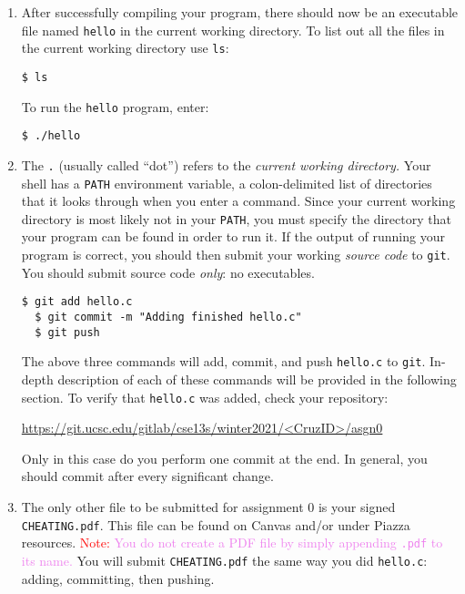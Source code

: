 \documentclass[11pt]{article}
\begin{document}
\begin{enumerate}
  \item After successfully compiling your program, there should now be an
    executable file named \texttt{hello} in the current working directory. To
    list out all the files in the current working directory use \texttt{ls}:

\begin{lstlisting}[style=bashstyle]
  $ ls
\end{lstlisting}

    To run the \texttt{hello} program, enter:

\begin{lstlisting}[style=bashstyle]
  $ ./hello
\end{lstlisting}

  \item The \texttt{.} (usually called ``dot'') refers to the \emph{current
    working directory.} Your shell has a \texttt{PATH} environment variable, a
    colon-delimited list of directories that it looks through when you enter a
    command. Since your current working directory is most likely not in your
    \texttt{PATH}, you must specify the directory that your program can be found
    in order to run it. If the output of running your program is correct, you
    should then submit your working \emph{source code} to \texttt{git}. You
    should submit source code \emph{only}: no executables.

\begin{lstlisting}[style=bashstyle]
  $ git add hello.c
  $ git commit -m "Adding finished hello.c"
  $ git push
\end{lstlisting}

    The above three commands will add, commit, and push \texttt{hello.c} to
    \texttt{git}. In-depth description of each of these commands will be
    provided in the following section. To verify that \texttt{hello.c} was
    added, check your repository:

    \centerline{\url{https://git.ucsc.edu/gitlab/cse13s/winter2021/<CruzID>/asgn0}}

    Only in this case do you perform one commit at the end. In general, you
    should commit after every significant change.

  \item The only other file to be submitted for assignment 0 is your signed
    \texttt{CHEATING.pdf}. This file can be found on Canvas and/or under Piazza
    resources. \textcolor{red}{Note:} \textcolor{violet}{You do not create a
    PDF file by simply appending \texttt{.pdf} to its name.} You will submit
    \texttt{CHEATING.pdf} the same way you did \texttt{hello.c}: adding,
    committing, then pushing.
\end{enumerate}
\end{document}
